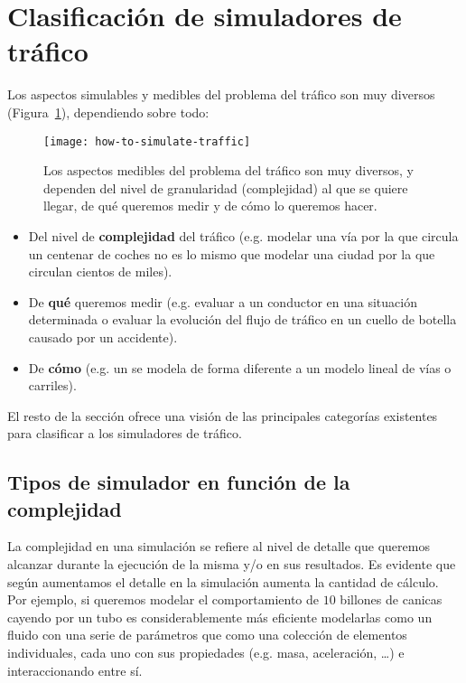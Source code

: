 \section{Clasificación de simuladores de tráfico}

Los aspectos simulables y medibles del problema del tráfico son muy diversos (Figura~\ref{fig:how-to-simulate-traffic}), dependiendo sobre todo:

\begin{figure}
	\centering
	\texttt{[image: how-to-simulate-traffic]}
	\caption[Aspectos medibles del tráfico]{Los aspectos medibles del problema del tráfico son muy diversos, y dependen del nivel de granularidad (complejidad) al que se quiere llegar, de qué queremos medir y de cómo lo queremos hacer.}
	\label{fig:how-to-simulate-traffic}
\end{figure}

\begin{itemize}
	\item Del nivel de \textbf{complejidad} del tráfico (e.g. modelar una vía por la que circula un centenar de coches no es lo mismo que modelar una ciudad por la que circulan cientos de miles).
	\item De \textbf{qué} queremos medir (e.g. evaluar a un conductor en una situación determinada o evaluar la evolución del flujo de tráfico en un cuello de botella causado por un accidente).
	\item De \textbf{cómo} (e.g. un  se modela de forma diferente a un modelo lineal de vías o carriles).
\end{itemize}

El resto de la sección ofrece una visión de las principales categorías existentes para clasificar a los simuladores de tráfico.

\subsection{Tipos de simulador en función de la complejidad}

La complejidad en una simulación se refiere al nivel de detalle que queremos alcanzar durante la ejecución de la misma y/o en sus resultados. Es evidente que según aumentamos el detalle en la simulación aumenta la cantidad de cálculo. Por ejemplo, si queremos modelar el comportamiento de $10$ billones de canicas cayendo por un tubo es considerablemente más eficiente modelarlas como un fluido con una serie de parámetros que como una colección de elementos individuales, cada uno con sus propiedades (e.g. masa, aceleración, \ldots) e interaccionando entre sí.

